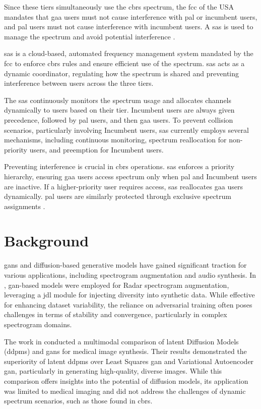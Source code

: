 Since these tiers simultaneously use the \gls{cbrs} spectrum, the \gls{fcc} of the USA mandates that \gls{gaa} users must not cause interference with \gls{pal} or incumbent users, and \gls{pal} users must not cause interference with incumbent users. A \gls{sas} is used to manage the spectrum and avoid potential interference \cite{3}.

\gls{sas} is a cloud-based, automated frequency management system mandated by the \gls{fcc} to enforce \gls{cbrs} rules and ensure efficient use of the spectrum. \gls{sas} acts as a dynamic coordinator, regulating how the spectrum is shared and preventing interference between users across the three tiers.

The \gls{sas} continuously monitors the spectrum usage and allocates channels dynamically to users based on their tier. Incumbent users are always given precedence, followed by \gls{pal} users, and then \gls{gaa} users.
To prevent collision scenarios, particularly involving Incumbent users, \gls{sas} currently employs several mechanisms, including continuous monitoring, spectrum reallocation for non-priority users, and preemption for Incumbent users.

Preventing interference is crucial in \gls{cbrs} operations. \gls{sas} enforces a priority hierarchy, ensuring \gls{gaa} users access spectrum only when \gls{pal} and Incumbent users are inactive. If a higher-priority user requires access, \gls{sas} reallocates \gls{gaa} users dynamically. \gls{pal} users are similarly protected through exclusive spectrum assignments \cite{4}.  

\section{Background}

\gls{gan}s and diffusion-based generative models have gained significant traction for various applications, including spectrogram augmentation and audio synthesis. In \cite{14}, \gls{gan}-based models were employed for Radar spectrogram augmentation, leveraging a \gls{jdl} module for injecting diversity into synthetic data. While effective for enhancing dataset variability, the reliance on adversarial training often poses challenges in terms of stability and convergence, particularly in complex spectrogram domains.


The work in \cite{9} conducted a multimodal comparison of latent Diffusion Models (\gls{ddpm}s) and \gls{gan}s for medical image synthesis. Their results demonstrated the superiority of latent \gls{ddpm}s over Least Squares \gls{gan} and Variational Autoencoder \gls{gan}, particularly in generating high-quality, diverse images. While this comparison offers insights into the potential of diffusion models, its application was limited to medical imaging and did not address the challenges of dynamic spectrum scenarios, such as those found in \gls{cbrs}.

